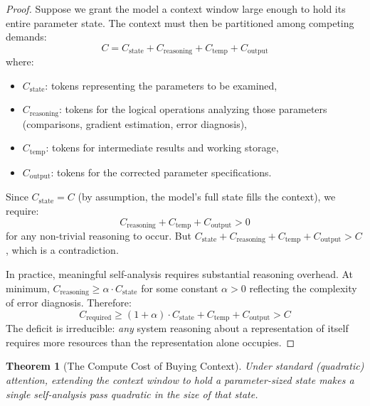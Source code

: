 \documentclass[11pt,a4paper]{article}
\newtheorem{theorem}{Theorem}[section]
\begin{document}
\begin{proof}
Suppose we grant the model a context window large enough to hold its entire parameter state. The context must then be partitioned among competing demands:
\begin{equation}
C = C_{\mathrm{state}} + C_{\mathrm{reasoning}} + C_{\mathrm{temp}} + C_{\mathrm{output}}
\end{equation}
where:
\begin{itemize}
    \item $C_{\mathrm{state}}$: tokens representing the parameters to be examined,
    \item $C_{\mathrm{reasoning}}$: tokens for the logical operations analyzing those parameters (comparisons, gradient estimation, error diagnosis),
    \item $C_{\mathrm{temp}}$: tokens for intermediate results and working storage,
    \item $C_{\mathrm{output}}$: tokens for the corrected parameter specifications.
\end{itemize}
Since $C_{\mathrm{state}} = C$ (by assumption, the model's full state fills the context), we require:
\begin{equation}
C_{\mathrm{reasoning}} + C_{\mathrm{temp}} + C_{\mathrm{output}} > 0
\end{equation}
for any non-trivial reasoning to occur. But $C_{\mathrm{state}} + C_{\mathrm{reasoning}} + C_{\mathrm{temp}} + C_{\mathrm{output}} > C$, which is a contradiction.

In practice, meaningful self-analysis requires substantial reasoning overhead. At minimum, $C_{\mathrm{reasoning}} \geq \alpha \cdot C_{\mathrm{state}}$ for some constant $\alpha > 0$ reflecting the complexity of error diagnosis. Therefore:
\begin{equation}
C_{\mathrm{required}} \geq (1 + \alpha) \cdot C_{\mathrm{state}} + C_{\mathrm{temp}} + C_{\mathrm{output}} > C
\end{equation}
The deficit is irreducible: \emph{any} system reasoning about a representation of itself requires more resources than the representation alone occupies.
\end{proof}

\begin{theorem}[The Compute Cost of Buying Context]
\label{thm:scaling}
Under standard (quadratic) attention, extending the context window to hold a parameter-sized state makes a single self-analysis pass quadratic in the size of that state.
\end{theorem}
\end{document}
